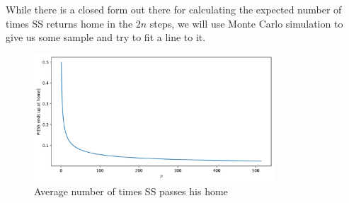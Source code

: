 While there is a closed form out there for calculating the expected number of times SS returns home in the $2n$ steps,
we will use Monte Carlo simulation to give us some sample and try to fit a line to it.

\begin{figure}[h]
	\centering
	\includegraphics[width=0.8\textwidth]{graphics/02-endsathome.png}
	\caption{Average number of times SS passes his home}
\end{figure}
